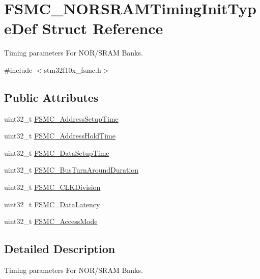 \hypertarget{struct_f_s_m_c___n_o_r_s_r_a_m_timing_init_type_def}{}\section{F\+S\+M\+C\+\_\+\+N\+O\+R\+S\+R\+A\+M\+Timing\+Init\+Type\+Def Struct Reference}
\label{struct_f_s_m_c___n_o_r_s_r_a_m_timing_init_type_def}


Timing parameters For N\+O\+R/\+S\+R\+AM Banks.  




{\ttfamily \#include $<$stm32f10x\+\_\+fsmc.\+h$>$}

\subsection*{Public Attributes}
\begin{DoxyCompactItemize}
\item 
uint32\+\_\+t \hyperlink{struct_f_s_m_c___n_o_r_s_r_a_m_timing_init_type_def_a2ba90f4ec16bc38a2c4fa29c593b713b}{F\+S\+M\+C\+\_\+\+Address\+Setup\+Time}
\item 
uint32\+\_\+t \hyperlink{struct_f_s_m_c___n_o_r_s_r_a_m_timing_init_type_def_a917b227ccb0a765791897ce3647ab26b}{F\+S\+M\+C\+\_\+\+Address\+Hold\+Time}
\item 
uint32\+\_\+t \hyperlink{struct_f_s_m_c___n_o_r_s_r_a_m_timing_init_type_def_aaa0a9178766adeed424d5c4eb728d1b1}{F\+S\+M\+C\+\_\+\+Data\+Setup\+Time}
\item 
uint32\+\_\+t \hyperlink{struct_f_s_m_c___n_o_r_s_r_a_m_timing_init_type_def_a3d98d57618e46ec6aa5d876dcc047d32}{F\+S\+M\+C\+\_\+\+Bus\+Turn\+Around\+Duration}
\item 
uint32\+\_\+t \hyperlink{struct_f_s_m_c___n_o_r_s_r_a_m_timing_init_type_def_a251b439331b82eecea58aa3f8882ea15}{F\+S\+M\+C\+\_\+\+C\+L\+K\+Division}
\item 
uint32\+\_\+t \hyperlink{struct_f_s_m_c___n_o_r_s_r_a_m_timing_init_type_def_abc33886615fc3627448aa2dba11cfc77}{F\+S\+M\+C\+\_\+\+Data\+Latency}
\item 
uint32\+\_\+t \hyperlink{struct_f_s_m_c___n_o_r_s_r_a_m_timing_init_type_def_a261d043a19cecf77e6859403be204efc}{F\+S\+M\+C\+\_\+\+Access\+Mode}
\end{DoxyCompactItemize}


\subsection{Detailed Description}
Timing parameters For N\+O\+R/\+S\+R\+AM Banks. 

